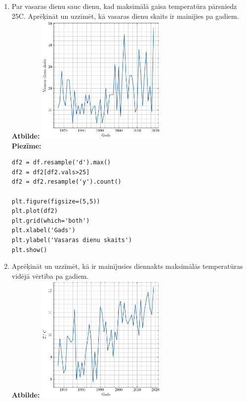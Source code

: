 \documentclass[12pt]{article}
\begin{document}
\begin{enumerate}
        \textbf{Piezīme:}
        \begin{verbatim}
df2 = df[(df.index.month>=6)*(df.index.month<=8)]
df2 = df2.resample('y').mean()

plt.figure(figsize=(5,5))
plt.plot(df2)
plt.grid(which='both')
plt.xlabel('Gads')
plt.ylabel('$T, ^\circ C$')
plt.show()
        \end{verbatim}
        \item Par vasaras dienu sauc dienu, kad maksimālā gaisa temperatūra pārsniedz 25C. Aprēķināt un uzzīmēt, kā vasaras dienu skaits ir mainījies pa gadiem.\\

        \textbf{Atbilde:} \includegraphics[width=0.5\textwidth]{3.uzd.png}\\

        \textbf{Piezīme:}
\begin{verbatim}
df2 = df.resample('d').max()
df2 = df2[df2.vals>25]
df2 = df2.resample('y').count()

plt.figure(figsize=(5,5))
plt.plot(df2)
plt.grid(which='both')
plt.xlabel('Gads')
plt.ylabel('Vasaras dienu skaits')
plt.show()
\end{verbatim}
        \item Aprēķināt un uzzīmēt, kā ir mainījusies diennakts maksimālās temperatūras vidējā vērtība pa gadiem.\\

        \textbf{Atbilde:} \includegraphics[width=0.5\textwidth]{4. uzd.png}\\


\end{enumerate}
\end{document}
